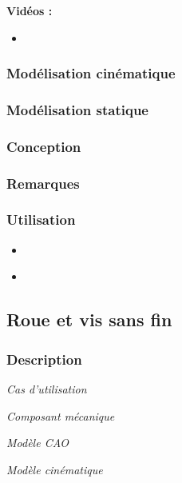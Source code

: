 \documentclass[11pt,oneside]{article}
\begin{document}
\textbf{Vidéos :}
\begin{itemize}
\item
\end{itemize}

\subsubsection{Modélisation cinématique}
\subsubsection{Modélisation statique}
\subsubsection{Conception}
\subsubsection{Remarques}
\subsubsection{Utilisation}
\begin{itemize}
\item
\end{itemize}

\begin{itemize}
\item
\end{itemize}
\newpage

\subsection{Roue et vis sans fin}
\subsubsection{Description}

\begin{center}
\hfill
\begin{minipage}[c]{.21\linewidth}
\begin{center}
\textit{Cas d'utilisation}
\end{center}
\end{minipage} \hfill
\begin{minipage}[c]{.21\linewidth}
\begin{center}
\textit{Composant mécanique}
\end{center}
\end{minipage} \hfill
\begin{minipage}[c]{.21\linewidth}
\begin{center}
\textit{Modèle CAO}
\end{center} 
\end{minipage}\hfill
\begin{minipage}[c]{.21\linewidth}
\begin{center}
\textit{Modèle cinématique}
\end{center} 
\end{minipage}\hfill
\end{center}
\end{document}
